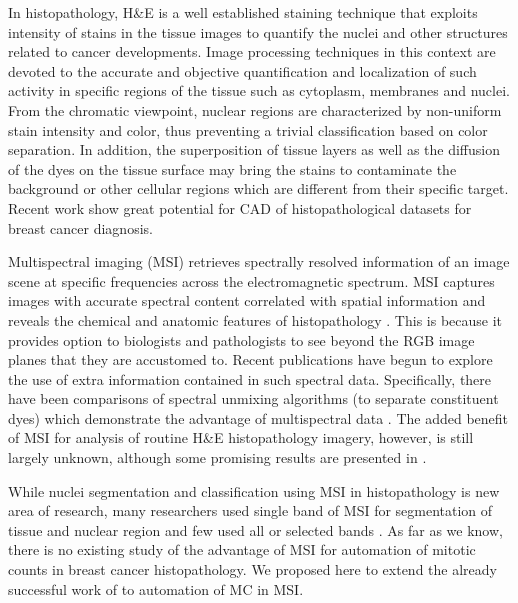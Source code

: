 \documentclass[10pt,twocolumn,letterpaper]{article}
\begin{document}
In histopathology, H\&E is a well established staining technique that exploits intensity of stains in the tissue images to quantify the nuclei and other structures related to cancer developments. Image processing techniques in this context are devoted to the accurate and objective quantification and localization of such activity in specific regions of the tissue such as cytoplasm, membranes and nuclei. From the chromatic viewpoint, nuclear regions are characterized by non-uniform stain intensity and color, thus preventing a trivial classification based on color separation. In addition, the superposition of tissue layers as well as the diffusion of the dyes on the tissue surface may bring the stains to contaminate the background or other cellular regions which are different from their specific target. Recent work \cite{khan2012b, irshad2013a, irshad2013b} show great potential for CAD of histopathological datasets for breast cancer diagnosis.

Multispectral imaging (MSI) retrieves spectrally resolved information of an image scene at specific frequencies across the electromagnetic spectrum. MSI captures images with accurate spectral content correlated with spatial information and reveals the chemical and anatomic features of histopathology \cite{levenson2006b, levenson2008}. This is because it provides option to biologists and pathologists to see beyond the RGB image planes that they are accustomed to. Recent publications \cite{fernandez2005, levenson2006, wu2012, khelifi2012} have begun to explore the use of extra information contained in such spectral data. Specifically, there have been comparisons of spectral unmixing algorithms (to separate constituent dyes) which demonstrate the advantage of multispectral data \cite{levenson2003, gentry1999}. The added benefit of MSI for analysis of routine H\&E histopathology imagery, however, is still largely unknown, although some promising results are presented in \cite{roula2003, fernandez2005, khelifi2012, wu2012}.

While nuclei segmentation and classification using MSI in histopathology is new area of research, many researchers used single band of MSI for segmentation of tissue and nuclear region \cite{boucheron2007, wu2009, masood2009} and few used all or selected bands \cite{fernandez2005, khelifi2012}. As far as we know, there is no existing study of the advantage of MSI for automation of mitotic counts in breast cancer histopathology. We proposed here to extend the already successful work of \cite{irshad2013b} to automation of MC in MSI.
\end{document}
